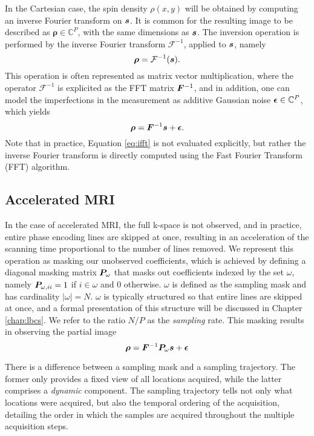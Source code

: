 In the Cartesian case, the spin density $\rho(x,y)$ will be obtained by computing an inverse Fourier transform on ${\bm{s}}$. It is common for the resulting image to be described as $\boldsymbol{\rho} \in \mathbb{C}^P$, with the same dimensions as ${\bm{s}}$. The inversion operation is performed by the inverse Fourier transform $\mathcal{F}^{-1}$, applied to ${\bm{s}}$, namely 
\begin{equation}
    \boldsymbol{\rho} = \mathcal{F}^{-1}({\bm{s}}).
\end{equation}
This operation is often represented as matrix vector multiplication, where the operator $\mathcal{F}^{-1}$ is explicited as the FFT matrix ${\bm{F}}^{-1}$, and in addition, one can model the imperfections in the measurement as additive Gaussian noise $\boldsymbol{\epsilon} \in \mathbb{C}^P$, which yields
\begin{equation}
    \boldsymbol{\rho} = {\bm{F}}^{-1} {\bm{s}} + \boldsymbol{\epsilon}. \label{eq:ifft}
\end{equation}
Note that in practice, Equation \ref{eq:ifft} is not evaluated explicitly, but rather the inverse Fourier transform is directly computed using the Fast Fourier Transform (FFT) algorithm.

\subsection{Accelerated MRI}\label{s:acc_MRI}
 In the case of accelerated MRI, the full k-space is not observed, and in practice, entire phase encoding lines are skipped at once, resulting in an acceleration of the scanning time proportional to the number of lines removed. We represent this operation as masking our unobserved coefficients, which is achieved by defining a diagonal masking matrix ${\bm{P}}_\omega$ that masks out coefficients indexed by the set $\omega$, namely ${\bm{P}}_{\omega,ii} = 1$ if $i\in \omega$ and $0$ otherwise. $\omega$ is defined as the sampling mask and has cardinality $|\omega| = N$. $\omega$ is typically structured so that entire lines are skipped at once, and a formal presentation of this structure will be discussed in Chapter \ref{chap:lbcs}. We refer to the ratio $N/P$ as the \textit{sampling} rate. This masking results in observing the partial image
\begin{equation}
    \boldsymbol{\rho} = {\bm{F}}^{-1} {\bm{P}}_\omega {\bm{s}} + \boldsymbol{\epsilon} \label{eq:acceleratedMRI1}
\end{equation}

\begin{remark}
    There is a difference between a sampling mask and a sampling trajectory. The former only provides a fixed view of all locations acquired, while the latter comprises a \textit{dynamic} component. The sampling trajectory tells not only what locations were acquired, but also the temporal ordering of the acquisition, detailing the order in which the samples are acquired throughout the multiple acquisition steps.
\end{remark}

